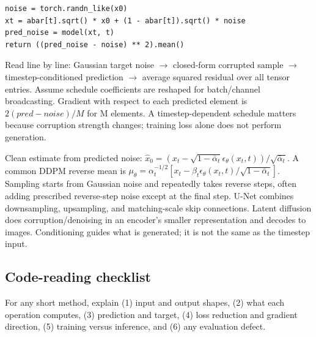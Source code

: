 \documentclass[11pt]{article}
\begin{document}
\begin{lstlisting}
noise = torch.randn_like(x0)
xt = abar[t].sqrt() * x0 + (1 - abar[t]).sqrt() * noise
pred_noise = model(xt, t)
return ((pred_noise - noise) ** 2).mean()
\end{lstlisting}

Read line by line: Gaussian target noise \ensuremath{\rightarrow} closed-form corrupted sample \ensuremath{\rightarrow} timestep-conditioned prediction \ensuremath{\rightarrow} average squared residual over all tensor entries. Assume schedule coefficients are reshaped for batch/\allowbreak{}channel broadcasting. Gradient with respect to each predicted element is $2(pred-noise)/M$ for M elements. A timestep-dependent schedule matters because corruption strength changes; training loss alone does not perform generation.

Clean estimate from predicted noise: $\hat x_0=(x_t-\sqrt{1-\bar\alpha_t}\epsilon_\theta(x_t,t))/\sqrt{\bar\alpha_t}$. A common DDPM reverse mean is $\mu_\theta=\alpha_t^{-1/2}[x_t-\beta_t\epsilon_\theta(x_t,t)/\sqrt{1-\bar\alpha_t}]$. Sampling starts from Gaussian noise and repeatedly takes reverse steps, often adding prescribed reverse-step noise except at the final step. U-Net combines downsampling, upsampling, and matching-scale skip connections. Latent diffusion does corruption/\allowbreak{}denoising in an encoder's smaller representation and decodes to images. Conditioning guides what is generated; it is not the same as the timestep input.

\subsection*{Code-reading checklist}

For any short method, explain (1) input and output shapes, (2) what each operation computes, (3) prediction and target, (4) loss reduction and gradient direction, (5) training versus inference, and (6) any evaluation defect.
\end{document}
